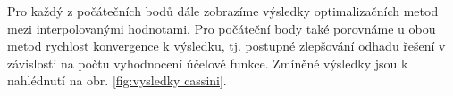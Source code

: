 
Pro každý z počátečních bodů dále zobrazíme výsledky optimalizačních metod mezi interpolovanými hodnotami. Pro počáteční body také porovnáme u obou metod rychlost konvergence k výsledku, tj. postupné zlepšování odhadu řešení v závislosti na počtu vyhodnocení účelové funkce. Zmíněné výsledky jsou k nahlédnutí na obr. \ref{fig:vysledky cassini}.

